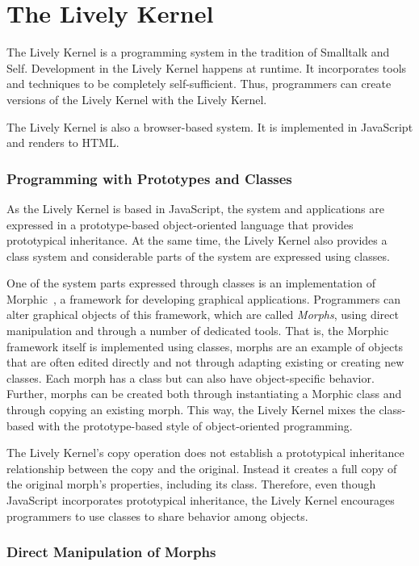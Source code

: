 \section{The Lively Kernel}

The Lively Kernel is a programming system in the tradition of Smalltalk and Self.
Development in the Lively Kernel happens at runtime.
It incorporates tools and techniques to be completely self-sufficient.
Thus, programmers can create versions of the Lively Kernel with the Lively Kernel.

The Lively Kernel is also a browser-based system.
It is implemented in JavaScript and renders to HTML.

\subsubsection{Programming with Prototypes and Classes}

As the Lively Kernel is based in JavaScript, the system and applications are expressed in a prototype-based object-oriented language that provides prototypical inheritance.
At the same time, the Lively Kernel also provides a class system and considerable parts of the system are expressed using classes.

One of the system parts expressed through classes is an implementation of Morphic~\cite{Maloney1995Mor}, a framework for developing graphical applications.
Programmers can alter graphical objects of this framework, which are called \emph{Morphs}, using direct manipulation and through a number of dedicated tools.
That is, the Morphic framework itself is implemented using classes, morphs are an example of objects that are often edited directly and not through adapting existing or creating new classes.
Each morph has a class but can also have object-specific behavior.
Further, morphs can be created both through instantiating a Morphic class and through copying an existing morph.
This way, the Lively Kernel mixes the class-based with the prototype-based style of object-oriented programming.

The Lively Kernel's copy operation does not establish a prototypical inheritance relationship between the copy and the original.
Instead it creates a full copy of the original morph's properties, including its class.
Therefore, even though JavaScript incorporates prototypical inheritance, the Lively Kernel encourages programmers to use classes to share behavior among objects.

\subsubsection{Direct Manipulation of Morphs}

